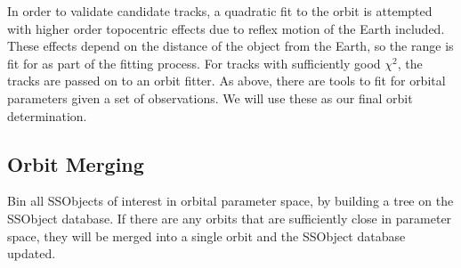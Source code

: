 In order to validate candidate tracks, a quadratic fit to the orbit is attempted with higher order topocentric effects due to reflex motion of the Earth included.  These effects depend on the distance of the object from the Earth, so the range is fit for as part of the fitting process.  For tracks with sufficiently good $\chi^2$, the tracks are passed on to an orbit fitter.  As above, there are tools to fit for orbital parameters given a set of observations.  We will use these as our final orbit determination.

\subsection{Orbit Merging}
\label{sec:acOrbitMerging}
Bin all SSObjects of interest in orbital parameter space, by building a tree on the SSObject database.  If there are any orbits that are sufficiently close in parameter space, they will be merged into a single orbit and the SSObject database updated.
